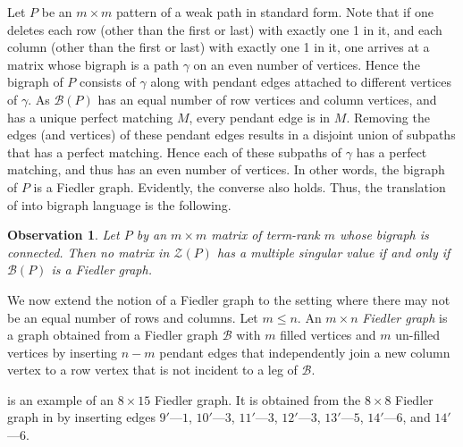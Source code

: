 \documentclass[preprint,12pt]{elsarticle}
\newtheorem{observation}[theorem]{Observation}
\begin{document}
Let $P$ be an $m\times m$ pattern of a weak path in standard form. 
Note that if one deletes each row (other than the first or last) 
with exactly one 1 in it, and each column (other than the first or last)  with exactly one 1
in it, one arrives at a matrix whose bigraph 
is a path $\gamma$ on an even number of vertices. Hence the bigraph of $P$ consists of 
$\gamma$ along with pendant edges attached to 
different vertices of $\gamma$. 
As $\mathcal{B}(P)$ has an equal number of row vertices and column vertices, and has a unique perfect matching $M$, every pendant edge is in $M$. Removing the 
edges (and vertices) of these pendant edges results in a disjoint union of subpaths that has a perfect matching.  Hence each of these subpaths of $\gamma$ 
has a perfect matching, and thus has an even number of vertices.  
 In other words, the bigraph of $P$ is a Fiedler graph.  Evidently, the converse also holds.  Thus, the translation of   into bigraph language is the following. 

\begin{observation}
\label{fiedlergraphdistinct}
Let $P$ by an $m\times m$ matrix of term-rank $m$ whose bigraph is connected.  Then no matrix in $\mathcal{Z}(P)$ has a multiple singular value if and only if $\mathcal{B}(P)$
is a Fiedler graph. 
\end{observation}


We now extend the notion of a Fiedler graph to the setting where there may not be an equal number of rows and columns.
Let $m\leq n$. An $m\times n$ \textit{Fiedler graph} is a graph obtained
from a Fiedler graph $\mathcal{B}$ with $m$ filled vertices and $m$ un-filled vertices
by inserting $n-m$ pendant edges that independently join a new column vertex to a row vertex that is not incident to a leg of $\mathcal{B}$. 


 is an example of an $8\times 15$ Fiedler graph.
It is obtained from the $8\times 8$ Fiedler graph in 
by inserting edges $9'$---$1$, $10'$---$3$, $11'$---$3$, $12'$---$3$, $13'$---$5$,
$14'$---$6$, and $14'$---$6$. 
\end{document}
